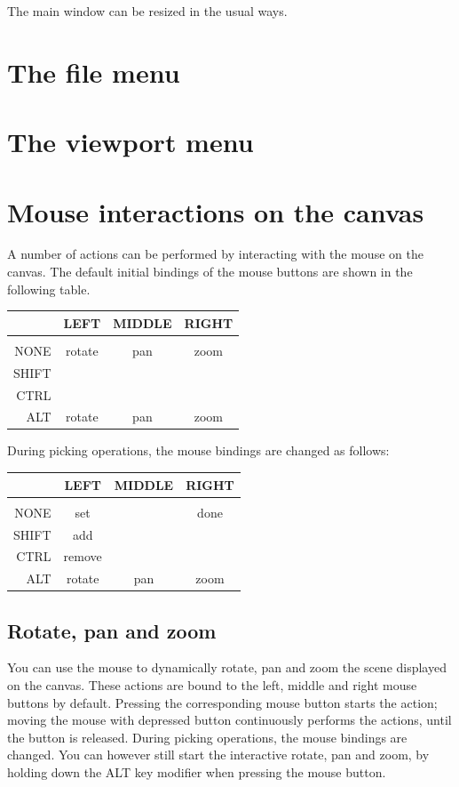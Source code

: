 The \pyf main window can be resized in the usual ways. 

   
\section{The file menu}
\label{sec:file-menu}


   
\section{The viewport menu}
\label{sec:viewport-menu}



\section{Mouse interactions on the canvas}
\label{sec:mouse-interactions}
A number of actions can be performed by interacting with the mouse on the canvas. 
The default initial bindings of the mouse buttons are shown in the following table. 
\begin{tabular}{r|ccc}
       &  LEFT  &   MIDDLE  &  RIGHT  \\
\hline\\
NONE   & rotate &    pan    &   zoom  \\
SHIFT  &        &           &         \\       
CTRL   &        &           &         \\
ALT    & rotate &    pan    &   zoom  \\
\end{tabular}
During picking operations, the mouse bindings are changed as follows:
\begin{tabular}{r|ccc}
       &  LEFT  &   MIDDLE  &  RIGHT  \\
\hline\\
NONE   &   set  &           &   done  \\
SHIFT  &   add  &           &         \\       
CTRL   & remove &           &         \\
ALT    & rotate &    pan    &   zoom  \\
\end{tabular}

 
\subsection{Rotate, pan and zoom}

You can use the mouse to dynamically rotate, pan and zoom the scene displayed on the canvas. These actions are bound to the left, middle and right mouse buttons by default. Pressing the corresponding mouse button starts the action; moving the mouse with depressed button continuously performs the actions, until the button is released. During picking operations, the mouse bindings are changed. You can however still start the interactive rotate, pan and zoom, by holding down the ALT key modifier when pressing the mouse button.

